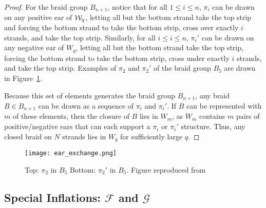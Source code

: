 \documentclass[paper.tex]{subfiles}
\begin{document}
\begin{proof}

    For the braid group $B_{n+1}$, notice that for all $1 \leq i \leq n$, $\pi_i$ can be drawn on any positive ear of $\mathcal{W}_q$, letting all but the bottom strand take the top strip and forcing the bottom strand to take the bottom strip, cross over exactly $i$ strands, and take the top strip. Similarly, for all $i \leq i \leq n$, $\pi_i'$ can be drawn on any negative ear of $W_q$, letting all but the bottom strand take the top strip, forcing the bottom strand to take the bottom strip, cross under exactly $i$ strands, and take the top strip. Examples of $\pi_2$ and $\pi_2'$ of the braid group $B_5$ are drawn in Figure~\ref{fig:earexchange}.

    Because this set of elements generates the braid group $B_{n+1}$, any braid $B \in B_{n+1}$ can be drawn as a sequence of $\pi_i$ and $\pi_i'$. If $B$ can be represented with $m$ of these elements, then the closure of $B$ lies in $W_m$, as $W_m$ contains $m$ pairs of positive/negative ears that can each support a $\pi_i$ or $\pi_i'$ structure. Thus, any closed braid on $N$ strands lies in $W_q$ for sufficiently large $q$.

\end{proof}



\begin{figure}[h]
  \centering
  \texttt{[image: ear\_exchange.png]}
  \caption{Top: $\pi_2$ in $B_5$ Bottom: $\pi_2'$ in $B_5$. Figure reproduced from~\cite{Ghrist1996}}\label{fig:earexchange}
\end{figure}








\subsection{Special Inflations: $\mathcal{F}$ and $\mathcal{G}$}
\end{document}
